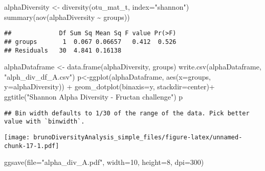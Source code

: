 \documentclass[
]{article}
\newenvironment{Shaded}{\begin{snugshade}}{\end{snugshade}}
\newcommand{\AttributeTok}[1]{\textcolor[rgb]{0.77,0.63,0.00}{#1}}
\newcommand{\DecValTok}[1]{\textcolor[rgb]{0.00,0.00,0.81}{#1}}
\newcommand{\FunctionTok}[1]{\textcolor[rgb]{0.00,0.00,0.00}{#1}}
\newcommand{\NormalTok}[1]{#1}
\newcommand{\OtherTok}[1]{\textcolor[rgb]{0.56,0.35,0.01}{#1}}
\newcommand{\SpecialCharTok}[1]{\textcolor[rgb]{0.00,0.00,0.00}{#1}}
\newcommand{\StringTok}[1]{\textcolor[rgb]{0.31,0.60,0.02}{#1}}
\begin{document}
\begin{Shaded}
\begin{Highlighting}[]
\NormalTok{alphaDiversity }\OtherTok{\textless{}{-}} \FunctionTok{diversity}\NormalTok{(otu\_mat\_t, }\AttributeTok{index=}\StringTok{"shannon"}\NormalTok{)}
\FunctionTok{summary}\NormalTok{(}\FunctionTok{aov}\NormalTok{(alphaDiversity }\SpecialCharTok{\textasciitilde{}}\NormalTok{ groups))}
\end{Highlighting}
\end{Shaded}

\begin{verbatim}
##             Df Sum Sq Mean Sq F value Pr(>F)
## groups       1  0.067 0.06657   0.412  0.526
## Residuals   30  4.841 0.16138
\end{verbatim}

\begin{Shaded}
\begin{Highlighting}[]
\NormalTok{alphaDataframe }\OtherTok{\textless{}{-}} \FunctionTok{data.frame}\NormalTok{(alphaDiversity, groups)}
\FunctionTok{write.csv}\NormalTok{(alphaDataframe, }\StringTok{"alph\_div\_df\_A.csv"}\NormalTok{)}
\NormalTok{p}\OtherTok{\textless{}{-}}\FunctionTok{ggplot}\NormalTok{(alphaDataframe, }\FunctionTok{aes}\NormalTok{(}\AttributeTok{x=}\NormalTok{groups, }\AttributeTok{y=}\NormalTok{alphaDiversity)) }\SpecialCharTok{+} 
  \FunctionTok{geom\_dotplot}\NormalTok{(}\AttributeTok{binaxis=}\StringTok{\textquotesingle{}y\textquotesingle{}}\NormalTok{, }\AttributeTok{stackdir=}\StringTok{\textquotesingle{}center\textquotesingle{}}\NormalTok{)}\SpecialCharTok{+}
  \FunctionTok{ggtitle}\NormalTok{(}\StringTok{"Shannon Alpha Diversity {-} Fructan challenge"}\NormalTok{)}
\NormalTok{p}
\end{Highlighting}
\end{Shaded}

\begin{verbatim}
## Bin width defaults to 1/30 of the range of the data. Pick better value with `binwidth`.
\end{verbatim}

\texttt{[image: brunoDiversityAnalysis\_simple\_files/figure-latex/unnamed-chunk-17-1.pdf]}

\begin{Shaded}
\begin{Highlighting}[]
\FunctionTok{ggsave}\NormalTok{(}\AttributeTok{file=}\StringTok{"alpha\_div\_A.pdf"}\NormalTok{, }\AttributeTok{width=}\DecValTok{10}\NormalTok{, }\AttributeTok{height=}\DecValTok{8}\NormalTok{, }\AttributeTok{dpi=}\DecValTok{300}\NormalTok{)}
\end{Highlighting}
\end{Shaded}
\end{document}

